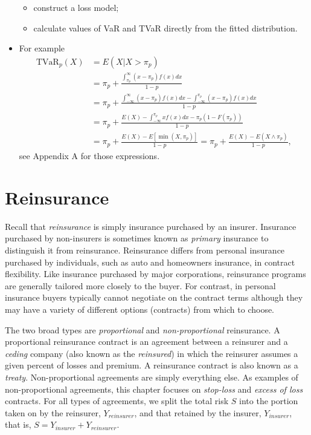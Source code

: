 \documentclass[]{book}
\theoremstyle{definition}
\theoremstyle{definition}
\theoremstyle{definition}
\theoremstyle{remark}
\begin{document}
\begin{itemize}
  \begin{itemize}
  \item
    construct a loss model;
  \item
    calculate values of VaR and TVaR directly from the fitted
    distribution.
  \end{itemize}
\item
  For example \[\begin{aligned}
    \text{TVaR}_p(X) &= E(X|X>\pi_p) \\
  &= \pi_p + \frac{\int_{\pi_p}^{\infty} (x-\pi_p) f(x) dx}{1-p} \\
  &= \pi_p + \frac{\int_{-\infty}^{\infty} (x-\pi_p) f(x) dx -\int_{-\infty}^{\pi_p} (x-\pi_p) f(x) dx }{1-p} \\
  &= \pi_p + \frac{E(X)-\int_{-\infty}^{\pi_p} xf(x) dx -\pi_p (1-F(\pi_p))}{1-p} \\
  &= \pi_p + \frac{E(X) - E[\min{(X,\pi_p)}]}{1-p} = \pi_p + \frac{E(X)-E(X \wedge \pi_p)}{1-p},\end{aligned}\]
  see Appendix A for those expressions.
\end{itemize}

\section{Reinsurance}\label{reinsurance-1}

Recall that \emph{reinsurance} is simply insurance purchased by an
insurer. Insurance purchased by non-insurers is sometimes known as
\emph{primary} insurance to distinguish it from reinsurance. Reinsurance
differs from personal insurance purchased by individuals, such as auto
and homeowners insurance, in contract flexibility. Like insurance
purchased by major corporations, reinsurance programs are generally
tailored more closely to the buyer. For contrast, in personal insurance
buyers typically cannot negotiate on the contract terms although they
may have a variety of different options (contracts) from which to
choose.

The two broad types are \emph{proportional} and \emph{non-proportional}
reinsurance. A proportional reinsurance contract is an agreement between
a reinsurer and a \emph{ceding} company (also known as the
\emph{reinsured}) in which the reinsurer assumes a given percent of
losses and premium. A reinsurance contract is also known as a
\emph{treaty}. Non-proportional agreements are simply everything else.
As examples of non-proportional agreements, this chapter focuses on
\emph{stop-loss} and \emph{excess of loss} contracts. For all types of
agreements, we split the total risk \(S\) into the portion taken on by
the reinsurer, \(Y_{reinsurer}\), and that retained by the insurer,
\(Y_{insurer}\), that is, \(S= Y_{insurer}+Y_{reinsurer}\).
\end{document}
